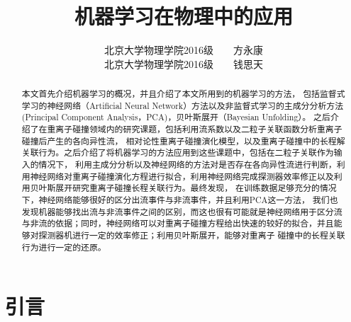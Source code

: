\documentclass[aps,pre,12pt,preprint,onecolumn,showpacs,showkeys]{revtex4-1}
\begin{document}
\title{\songti{}\bf{机器学习在物理中的应用}\vspace{15mm}}
\author{\songti{}北京大学物理学院2016级~~~~方永康\vspace{2mm}\\
\songti{}北京大学物理学院2016级~~~~钱思天\vspace{2mm}}

\begin{abstract}
\vspace{10mm}
\begin{spacing}{1.5}
\songti{}
本文首先介绍机器学习的概况，并且介绍了本文所用到的机器学习的方法，
包括监督式学习的神经网络（Artificial Neural Network）方法以及非监督式学习的主成分分析方法(Principal Component Analysis，PCA)，贝叶斯展开（Bayesian Unfolding）。
之后介绍了在重离子碰撞领域内的研究课题，包括利用流系数以及二粒子关联函数分析重离子碰撞后产生的各向异性流，
相对论性重离子碰撞演化模型，以及重离子碰撞中的长程解关联行为。之后介绍了将机器学习的方法应用到这些课题中，包括在二粒子关联作为输入的情况下，
利用主成分分析以及神经网络的方法对是否存在各向异性流进行判断，利用神经网络对重离子碰撞演化方程进行拟合，利用神经网络完成探测器效率修正以及利用贝叶斯展开研究重离子碰撞长程关联行为。最终发现，
在训练数据足够充分的情况下，神经网络能够很好的区分出流事件与非流事件，并且利用PCA这一方法，
我们也发现机器能够找出流与非流事件之间的区别，而这也很有可能就是神经网络用于区分流与非流的依据；同时，神经网络可以对重离子碰撞方程给出快速的较好的拟合，并且能够对探测器机进行一定的效率修正；利用贝叶斯展开，能够对重离子
碰撞中的长程关联行为进行一定的还原。
\end{spacing}
\end{abstract}
\maketitle


\section{引言}
\end{document}
